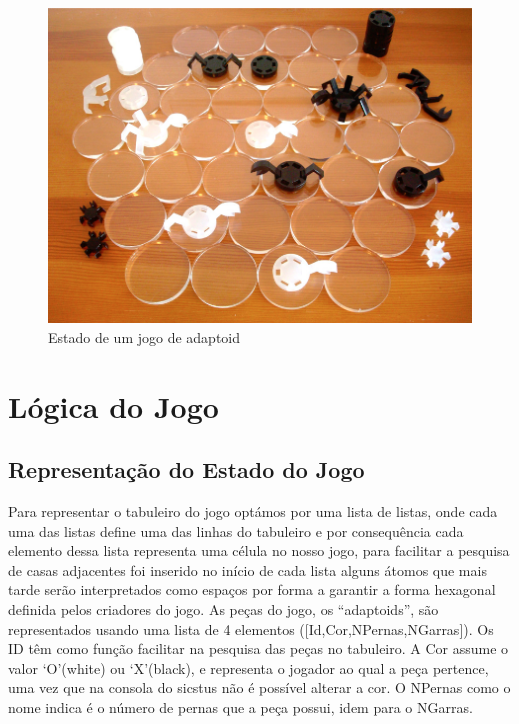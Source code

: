 \documentclass[a4paper]{article}
\begin{document}
\begin{figure}[h]
    \begin{center}
        \includegraphics[scale=0.5]{jogoDecorrer}
        \caption{Estado de um jogo de adaptoid}
        \centering
    \end{center}
\end{figure}

\newpage
\section{Lógica do Jogo}

\subsection{Representação do Estado do Jogo}  Para representar o tabuleiro do jogo optámos por uma lista de listas, onde cada uma das listas define uma das linhas do tabuleiro e por consequência cada elemento dessa lista representa uma célula no nosso jogo,  para facilitar a pesquisa de casas adjacentes foi inserido no início de cada lista alguns átomos que mais tarde serão interpretados como espaços por forma a garantir a forma hexagonal definida pelos criadores do jogo. As peças do jogo, os “adaptoids”, são representados usando uma lista de 4 elementos ([Id,Cor,NPernas,NGarras]). Os ID têm como função facilitar na pesquisa das peças no tabuleiro. A Cor assume o valor ‘O’(white) ou ‘X’(black), e representa o jogador ao qual a peça pertence, uma vez que na consola do sicstus não é possível alterar a cor. O NPernas como o nome indica é o número de pernas que a peça possui, idem para o NGarras.
\end{document}
